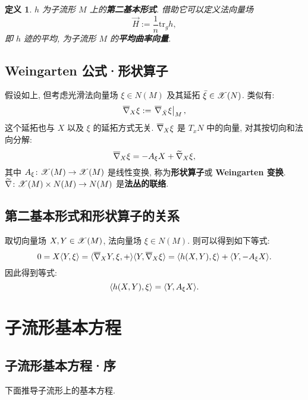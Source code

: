 \documentclass{ctexart}
\newtheorem{definition}[theorem]{定义}
\begin{document}
\begin{definition}
	$h$ 为子流形 $M$ 上的{\bf 第二基本形式}. 借助它可以定义法向量场
	\begin{equation}\label{eq::mean-curvature-vector-def}
		\overrightarrow{H} := \dfrac{1}{n}\mathrm{tr}_{g}h,
	\end{equation}
	即 $h$ 迹的平均, 为子流形 $M$ 的{\bf 平均曲率向量}.
\end{definition}

\subsection{Weingarten 公式·形状算子}
假设如上, 但考虑光滑法向量场 $\xi \in N(M)$ 及其延拓 $\bar{\xi} \in \mathscr{X}(N)$. 类似有:
\begin{equation*}
	\overline{\nabla}_{X}{\xi} := \left.\overline{\nabla}_{\bar{X}}{\xi}\right|_{M},
\end{equation*}
这个延拓也与 $X$ 以及 $\xi$ 的延拓方式无关. $\overline{\nabla}_{X}{\xi}$ 是 $T_xN$ 中的向量, 对其按切向和法向分解:
\begin{equation}\label{eq::Weingarten-formula}
	\overline{\nabla}_{X}{\xi} = -A_{\xi}X + \widetilde{\nabla}_{X}{\xi},
\end{equation}
其中 $A_{\xi} \colon \mathscr{X}(M) \rightarrow \mathscr{X}(M)$ 是线性变换, 称为{\bf 形状算子}或 {\bf Weingarten 变换}. $\widetilde{\nabla} \colon \mathscr{X}(M) \times N(M) \rightarrow N(M)$ 是{\bf 法丛的联络}.

\subsection{第二基本形式和形状算子的关系}
取切向量场 $X, Y \in \mathscr{X}(M)$, 法向量场 $\xi \in N(M)$. 则可以得到如下等式:
\begin{equation*}
	0 = X\langle {Y}, {\xi} \rangle = \langle {\overline{\nabla}_{X}{Y}, \xi}, {+} \rangle \langle {Y}, {\overline{\nabla}_{X}{\xi}} \rangle = \langle {h(X, Y)}, {\xi} \rangle + \langle {Y}, {-A_{\xi}X} \rangle.
\end{equation*}
因此得到等式:
\begin{equation}
	\langle {h(X, Y)}, {\xi} \rangle = \langle {Y}, {A_{\xi}{X}} \rangle.
\end{equation}

\section{子流形基本方程}
\subsection{子流形基本方程·序}
下面推导子流形上的基本方程.
\end{document}
